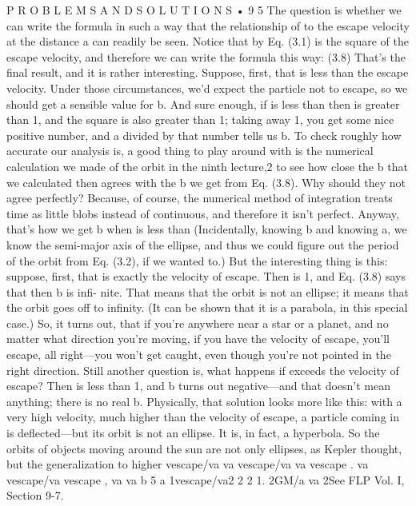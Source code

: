 \documentclass[10pt,oneside]{article}
\begin{document}
P R O B L E M S  A N D  S O L U T I O N S • 9 5 The question is whether we can write the formula in such a way that the relationship of to the escape velocity at the distance a can readily be seen. Notice that by Eq. (3.1) is the square of the escape velocity, and therefore we can write the formula this way: (3.8) That’s the final result, and it is rather interesting. Suppose, first, that is less than the escape velocity. Under those circumstances, we’d expect the particle not to escape, so we should get a sensible value for b. And sure enough, if is less than then is greater than 1, and the square is also greater than 1; taking away 1, you get some nice positive number, and a divided by that number tells us b. To check roughly how accurate our analysis is, a good thing to play around with is the numerical calculation we made of the orbit in the ninth lecture,2 to see how close the b that we calculated then agrees with the b we get from Eq. (3.8). Why should they not agree perfectly? Because, of course, the numerical method of integration treats time as little blobs instead of continuous, and therefore it isn’t perfect. Anyway, that’s how we get b when is less than (Incidentally, knowing b and knowing a, we know the semi-major axis of the ellipse, and thus we could figure out the period of the orbit from Eq. (3.2), if we wanted to.) But the interesting thing is this: suppose, first, that is exactly the velocity of escape. Then is 1, and Eq. (3.8) says that then b is infi- nite. That means that the orbit is not an ellipse; it means that the orbit goes off to infinity. (It can be shown that it is a parabola, in this special case.) So, it turns out, that if you’re anywhere near a star or a planet, and no matter what direction you’re moving, if you have the velocity of escape, you’ll escape, all right---you won’t get caught, even though you’re not pointed in the right direction. Still another question is, what happens if exceeds the velocity of escape? Then is less than 1, and b turns out negative---and that doesn’t mean anything; there is no real b. Physically, that solution looks more like this: with a very high velocity, much higher than the velocity of escape, a particle coming in is deflected---but its orbit is not an ellipse. It is, in fact, a hyperbola. So the orbits of objects moving around the sun are not only ellipses, as Kepler thought, but the generalization to higher vescape/va va vescape/va va vescape . va vescape/va vescape , va va b 5 a 1vescape/va2 2 2 1. 2GM/a va 2See FLP Vol. I, Section 9-7.\par
\end{document}
